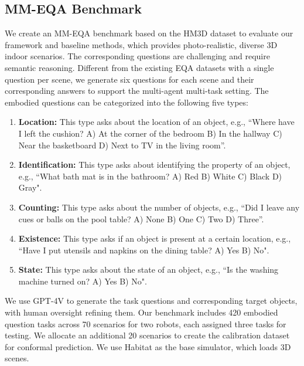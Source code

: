 
\subsection{MM-EQA Benchmark}

We create an MM-EQA benchmark based on the HM3D dataset \cite{ramakrishnan2021habitat} to evaluate our framework and baseline methods, which provides photo-realistic, diverse 3D indoor scenarios. 
The corresponding questions are challenging and require semantic reasoning. 
Different from the existing EQA datasets with a single question per scene, we generate six questions for each scene and their corresponding answers to support the multi-agent multi-task setting. 
The embodied questions can be categorized into the following five types:
\begin{enumerate}
    \item \textbf{Location:} This type asks about the location of an object, e.g., ``Where have I left the cushion? A) At the corner of the bedroom B) In the hallway C) Near the basketboard D) Next to TV in the living room''.
    \item \textbf{Identification:} This type asks about identifying the property of an object, e.g., ``What bath mat is in the bathroom? A) Red B) White C) Black D) Gray".
    \item \textbf{Counting:} This type asks about the number of objects, e.g., ``Did I leave any cues or balls on the pool table? A) None B) One C) Two D) Three''.
    \item \textbf{Existence:} This type asks if an object is present at a certain location, e.g., ``Have I put utensils and napkins on the dining table? A) Yes B) No". 
    \item \textbf{State:} This type asks about the state of an object, e.g., ``Is the washing machine turned on? A) Yes B) No". 
\end{enumerate}

We use GPT-4V to generate the task questions and corresponding target objects, with human oversight refining them. Our benchmark includes 420 embodied question tasks across 70 scenarios for two robots, each assigned three tasks for testing. We allocate an additional 20 scenarios to create the calibration dataset for conformal prediction. We use Habitat \cite{puig2023habitat} as the base simulator, which loads 3D scenes.

